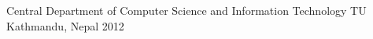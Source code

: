\begin{cvhonors}

  \cvhonor    
    {Central Department of Computer Science and Information Technology} %
    {TU} %
    {Kathmandu, Nepal} %
    {2012} %


\end{cvhonors}
